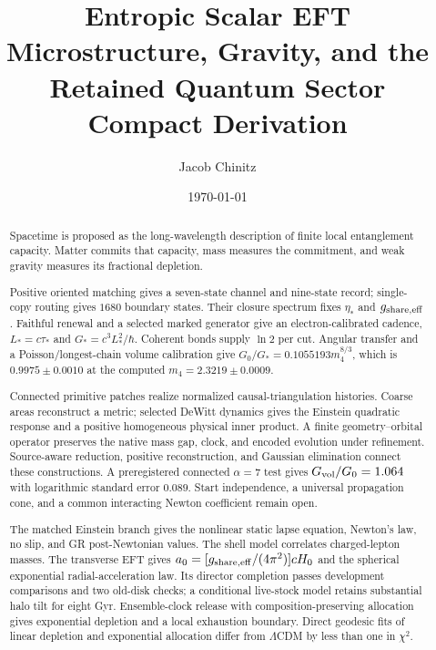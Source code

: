 \documentclass[11pt]{article}
\author{Jacob Chinitz}
\title{Entropic Scalar EFT\\[0.3em]\large Microstructure, Gravity, and the Retained Quantum Sector\\Compact Derivation}
\date{\today}
\begin{document}
\maketitle

\begin{abstract}
Spacetime is proposed as the long-wavelength description of finite local entanglement capacity. Matter commits that capacity, mass measures the commitment, and weak gravity measures its fractional depletion.

Positive oriented matching gives a seven-state channel and nine-state record; single-copy routing gives $1680$ boundary states. Their closure spectrum fixes $\eta_*$ and $g_{\rm share,eff}$. Faithful renewal and a selected marked generator give an electron-calibrated cadence, $L_*=c\tau_*$ and $G_*=c^3L_*^2/\hbar$. Coherent bonds supply $\ln2$ per cut. Angular transfer and a Poisson/longest-chain volume calibration give $G_0/G_*=0.1055193m_4^{8/3}$, which is $0.9975\pm0.0010$ at the computed $m_4=2.3219\pm0.0009$.

Connected primitive patches realize normalized causal-triangulation histories. Coarse areas reconstruct a metric; selected DeWitt dynamics gives the Einstein quadratic response and a positive homogeneous physical inner product. A finite geometry--orbital operator preserves the native mass gap, clock, and encoded evolution under refinement. Source-aware reduction, positive reconstruction, and Gaussian elimination connect these constructions. A preregistered connected $\alpha=7$ test gives $G_{\rm vol}/G_0=1.064$ with logarithmic standard error $0.089$. Start independence, a universal propagation cone, and a common interacting Newton coefficient remain open.

The matched Einstein branch gives the nonlinear static lapse equation, Newton's law, no slip, and GR post-Newtonian values. The shell model correlates charged-lepton masses. The transverse EFT gives $a_0=[g_{\rm share,eff}/(4\pi^2)]cH_0$ and the spherical exponential radial-acceleration law. Its director completion passes development comparisons and two old-disk checks; a conditional live-stock model retains substantial halo tilt for eight Gyr. Ensemble-clock release with composition-preserving allocation gives exponential depletion and a local exhaustion boundary. Direct geodesic fits of linear depletion and exponential allocation differ from $\Lambda$CDM by less than one in $\chi^2$.

\end{abstract}
\end{document}
